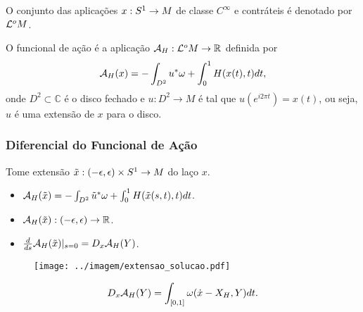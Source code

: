 \documentclass{beamer}
\begin{document}
\begin{footnotesize}
\begin{frame}
		O conjunto das aplicações $x:S^{1} \to M$ de classe $C^{\infty}$ e contráteis é denotado por $\mathcal{L}^{o}M$.
		
		\begin{definicao}
			O funcional de ação é a aplicação $\mathcal{A}_{H}: \mathcal{L}^{o}M\to \mathbb{R}^{}$ definida por
			$$
			\mathcal{A}_{H}(x) = -\int_{D^{2}}u^{*}\omega + \int_{0}^{1}H(x(t), t)dt,
			$$
			onde $D^{2} \subset \mathbb{C}$ é o disco fechado e $u:D^{2}\to M$ é tal que $u(e^{i2\pi t})=x(t)$, ou seja, $u$ é uma extensão de $x$ para o disco.
			
		\end{definicao}
	\end{frame}
	
	\begin{frame}
		\frametitle{Diferencial do Funcional de Ação}
		\begin{minipage}[t]{0.55\linewidth}
			Tome extensão 
			$
			\tilde{x}:(-\epsilon, \epsilon)\times S^{1} \to M
			$ do laço $x$.
			\begin{itemize}
				\item $
				\mathcal{A}_{H}(\tilde{x}) = -\int_{D^{2}}\tilde{u}^{*}\omega + \int_{0}^{1}H(\tilde{x}(s,t),t)dt
				$.
				
				\item $\mathcal{A}_{H}(\tilde{x}):(-\epsilon, \epsilon)\to \mathbb{R}^{}$.
				
				\item  $\frac{d }{d s}\mathcal{A}_{H}(\tilde{x})|_{s=0} = D_{x}\mathcal{A}_{H}(Y) $.
				
			\end{itemize}
			
		\end{minipage}
		\hfill
		\begin{minipage}[t]{0.4\linewidth}
			\begin{figure}[!h]
				\centering
				\texttt{[image: ../imagem/extensao\_solucao.pdf]}
				
			\end{figure}
		\end{minipage}
			
				
		\begin{proposicao}
			$$
		D_{x}\mathcal{A}_{H}(Y) = \int_{[0,1]} \omega(\dot{x} - X_{H}, Y)dt.
		$$
		\end{proposicao}
		
	\end{frame}
	

\end{footnotesize}
\end{document}
